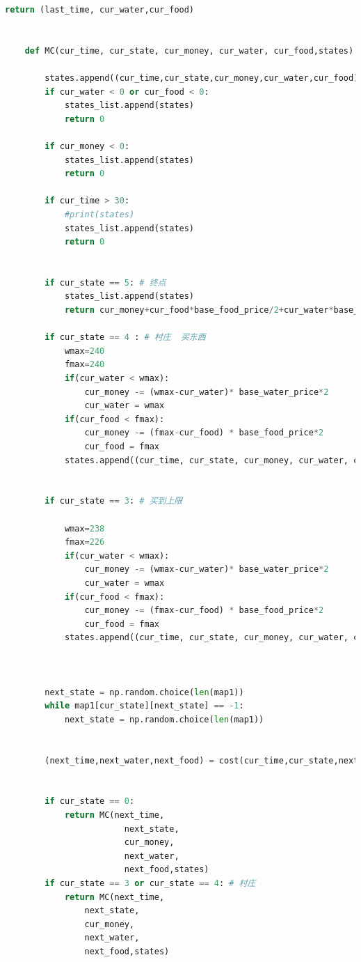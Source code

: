 \documentclass[withoutpreface,bwprint]{cumcmthesis} %
\begin{document}
\begin{appendices}
\begin{lstlisting}[language=python]
        return (last_time, cur_water,cur_food)
    
    
    def MC(cur_time, cur_state, cur_money, cur_water, cur_food,states):
    
        states.append((cur_time,cur_state,cur_money,cur_water,cur_food))
        if cur_water < 0 or cur_food < 0:
            states_list.append(states)
            return 0
    
        if cur_money < 0:
            states_list.append(states)
            return 0        
    
        if cur_time > 30:
            #print(states)
            states_list.append(states)
            return 0
        
    
        if cur_state == 5: # 终点
            states_list.append(states)
            return cur_money+cur_food*base_food_price/2+cur_water*base_water_price/2
        
        if cur_state == 4 : # 村庄  买东西
            wmax=240
            fmax=240
            if(cur_water < wmax):
                cur_money -= (wmax-cur_water)* base_water_price*2
                cur_water = wmax
            if(cur_food < fmax):
                cur_money -= (fmax-cur_food) * base_food_price*2
                cur_food = fmax
            states.append((cur_time, cur_state, cur_money, cur_water, cur_food))
    
    
        if cur_state == 3: # 买到上限
    
            wmax=238
            fmax=226
            if(cur_water < wmax):
                cur_money -= (wmax-cur_water)* base_water_price*2
                cur_water = wmax
            if(cur_food < fmax):
                cur_money -= (fmax-cur_food) * base_food_price*2
                cur_food = fmax
            states.append((cur_time, cur_state, cur_money, cur_water, cur_food))
    
    
    
        next_state = np.random.choice(len(map1))
        while map1[cur_state][next_state] == -1:
            next_state = np.random.choice(len(map1))
    
    
        (next_time,next_water,next_food) = cost(cur_time,cur_state,next_state,cur_water,cur_food,states)
    
    
        if cur_state == 0:
            return MC(next_time, 
                        next_state, 
                        cur_money, 
                        next_water, 
                        next_food,states)
        if cur_state == 3 or cur_state == 4: # 村庄
            return MC(next_time, 
                next_state, 
                cur_money, 
                next_water, 
                next_food,states)
                    

\end{lstlisting}
\end{appendices}
\end{document}

